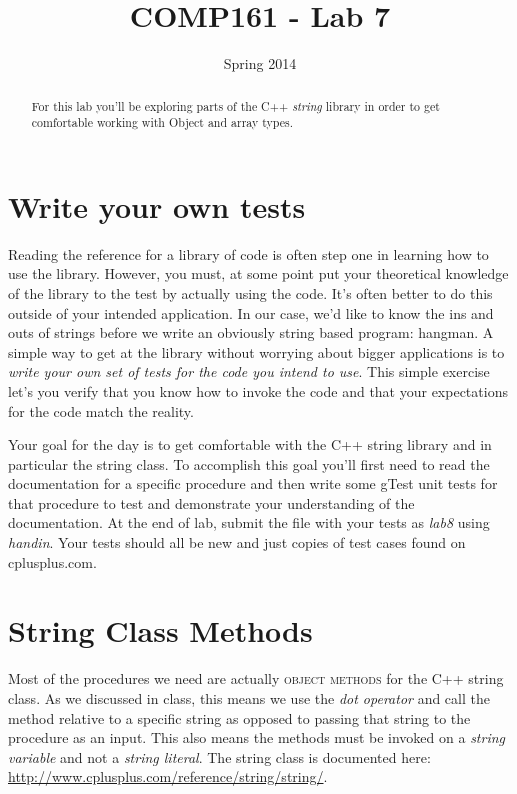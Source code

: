 \documentclass[]{tufte-handout}
\title{COMP161 - Lab 7}
\author{}
\date{Spring 2014}
\begin{document}
\maketitle

\begin{abstract}
For this lab you'll be exploring parts of the C++ \textit{string} library in order to get comfortable working with Object and array types.
\end{abstract}

\section{Write your own tests}

Reading the reference for a library of code is often step one in learning how to use the library.  However, you must, at some point put your theoretical knowledge of the library to the test by actually using the code.  It's often better to do this outside of your intended application.  In our case, we'd like to know the ins and outs of strings before we write an obviously string based program: hangman. A simple way to get at the library without worrying about bigger applications is to \textit{write your own set of tests for the code you intend to use}. This simple exercise let's you verify that you know how to invoke the code and that your expectations for the code match the reality.  

Your goal for the day is to get comfortable with the C++ string library and in particular the string class. To accomplish this goal you'll first need to read the documentation for a specific procedure and then write some gTest unit tests for that procedure to test and demonstrate your understanding of the documentation.  At the end of lab, submit the file with your tests as \textit{lab8} using \textit{handin}.  Your tests should all be new and just copies of test cases found on cplusplus.com.

\section{String Class Methods}

Most of the procedures we need are actually \textsc{object methods} for the C++ string class.  As we discussed in class, this means we use the \textit{dot operator} and call the method relative to a specific string as opposed to passing that string to the procedure as an input. This also means the methods must be invoked on a \textit{string variable} and not a \textit{string literal}. The string class is documented here: \url{http://www.cplusplus.com/reference/string/string/}.
\end{document}
